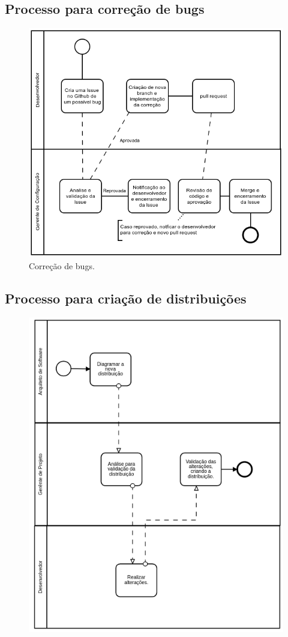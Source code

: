 \documentclass{article}
\begin{document}
        \subsection{Processo para correção de bugs}
	        \begin{figure}[H]
	        	\includegraphics[width=\linewidth]{bug.png}
	        	\caption{Correção de bugs.}
	        \end{figure}
        \subsection{Processo para criação de distribuições}
			\begin{figure}[H]
				\centering
				\includegraphics[width=0.7\linewidth]{processo_criacao_distribuicao}
				\caption{}
				\label{fig:processocriacaodistribuicao}
			\end{figure}
\end{document}
